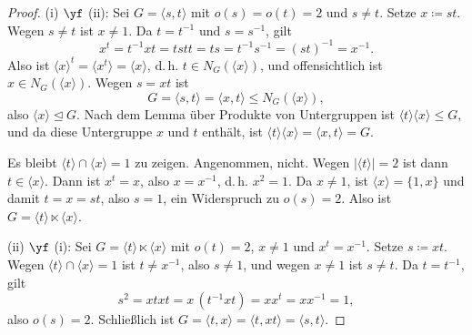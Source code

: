 \documentclass[11pt]{article}
\begin{document}
\begin{ergaenzung}
\begin{center}
\end{center}
\end{ergaenzung}


\begin{ergaenzung}
\begin{proof}
  \glqq(i) $\yf$ (ii)\grqq: Sei $G = \langle s, t \rangle$ mit $o(s) = o(t) = 2$ und $s \neq t$. Setze $x \coloneqq st$. Wegen $s \neq t$ ist $x \neq 1$. Da $t = t^{-1}$ und $s = s^{-1}$, gilt
  \[ x^t = t^{-1} x t = tstt = ts = t^{-1}s^{-1} = (st)^{-1} = x^{-1}. \]
  Also ist $\langle x \rangle^t = \langle x^t \rangle = \langle x \rangle$, d.\,h. $t \in N_G(\langle x \rangle)$, und offensichtlich ist $x \in N_G(\langle x \rangle)$. Wegen $s = xt$ ist
  \[ G = \langle s, t \rangle = \langle x, t \rangle \le N_G(\langle x \rangle), \]
  also $\langle x \rangle \trianglelefteq G$. Nach dem Lemma über Produkte von Untergruppen ist $\langle t \rangle \langle x \rangle \le G$, und da diese Untergruppe $x$ und $t$ enthält, ist $\langle t \rangle \langle x \rangle = \langle x, t \rangle = G$.

  Es bleibt $\langle t \rangle \cap \langle x \rangle = 1$ zu zeigen. Angenommen, nicht. Wegen $\lvert \langle t \rangle \rvert = 2$ ist dann $t \in \langle x \rangle$. Dann ist $x^t = x$, also $x = x^{-1}$, d.\,h. $x^2 = 1$. Da $x \neq 1$, ist $\langle x \rangle = \{1, x\}$ und damit $t = x = st$, also $s = 1$, ein Widerspruch zu $o(s) = 2$. Also ist $G = \langle t \rangle \ltimes \langle x \rangle$.


  \glqq(ii) $\yf$ (i)\grqq: Sei $G = \langle t \rangle \ltimes \langle x \rangle$ mit $o(t) = 2$, $x \neq 1$ und $x^t = x^{-1}$. Setze $s \coloneqq xt$. Wegen $\langle t \rangle \cap \langle x \rangle = 1$ ist $t \neq x^{-1}$, also $s \neq 1$, und wegen $x \neq 1$ ist $s \neq t$. Da $t = t^{-1}$, gilt
  \[ s^2 = xtxt = x\,(t^{-1}xt) = x x^t = x x^{-1} = 1, \]
  also $o(s) = 2$. Schließlich ist $G = \langle t, x \rangle = \langle t, xt \rangle = \langle s, t \rangle$.
\end{proof}
\end{ergaenzung}
\end{document}
